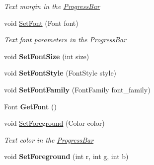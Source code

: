 \begin{DoxyCompactItemize}
\begin{DoxyCompactList}\small\item\em Text margin in the \mbox{\hyperlink{class_space_v_i_l_1_1_progress_bar}{Progress\+Bar}} \end{DoxyCompactList}\item 
void \mbox{\hyperlink{class_space_v_i_l_1_1_progress_bar_a97819041fe132c67cfca2b960d07a24c}{Set\+Font}} (Font font)
\begin{DoxyCompactList}\small\item\em Text font parameters in the \mbox{\hyperlink{class_space_v_i_l_1_1_progress_bar}{Progress\+Bar}} \end{DoxyCompactList}\item 
\mbox{\label{class_space_v_i_l_1_1_progress_bar_a27ec8eeb6379d7a91a3337f2545a1ae5}} 
void {\bfseries Set\+Font\+Size} (int size)
\item 
\mbox{\label{class_space_v_i_l_1_1_progress_bar_a8966ef49ff1d4cd3e487aad7faffd71e}} 
void {\bfseries Set\+Font\+Style} (Font\+Style style)
\item 
\mbox{\label{class_space_v_i_l_1_1_progress_bar_a1221d626049811fe424883a135dbc005}} 
void {\bfseries Set\+Font\+Family} (Font\+Family font\+\_\+family)
\item 
\mbox{\label{class_space_v_i_l_1_1_progress_bar_aa1b43c656b31d57ded4b9ffb8cf6c5ed}} 
Font {\bfseries Get\+Font} ()
\item 
void \mbox{\hyperlink{class_space_v_i_l_1_1_progress_bar_a0f02716ed6e2bd89e2dcf9ca6c575b84}{Set\+Foreground}} (Color color)
\begin{DoxyCompactList}\small\item\em Text color in the \mbox{\hyperlink{class_space_v_i_l_1_1_progress_bar}{Progress\+Bar}} \end{DoxyCompactList}\item 
\mbox{\label{class_space_v_i_l_1_1_progress_bar_a63f5661f820b5db78df71374f4d0162e}} 
void {\bfseries Set\+Foreground} (int r, int g, int b)
\item 
\mbox{\label{class_space_v_i_l_1_1_progress_bar_a5366fba9d281bd918d451c60f91f6365}} 

\end{DoxyCompactItemize}
